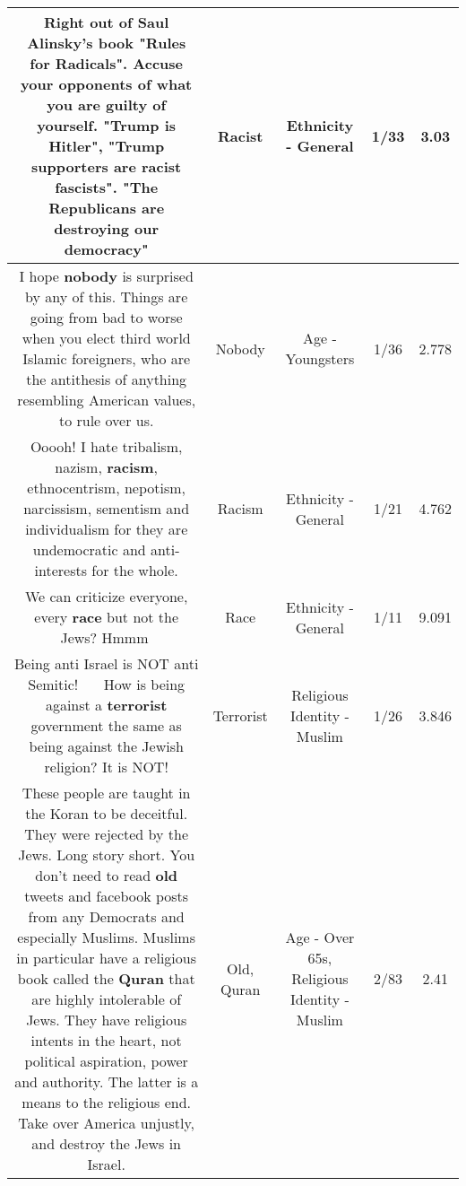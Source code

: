 \documentclass[11pt]{article}
\newlength\mylength
\begin{document}
\begin{center}
\begin{longtable}{|C{.65\mylength}|C{.30\mylength}|C{.12\mylength}|C{.12\mylength}|C{.12\mylength}|}
  \small Right out of Saul Alinsky's book "Rules for Radicals". Accuse your opponents of what you are guilty of yourself. "Trump is Hitler", "Trump supporters are \textbf{racist} fascists". "The Republicans are destroying our democracy"\normalsize   & Racist & Ethnicity - General & 1/33 & 3.03 \\  \hline
  \small I hope \textbf{nobody} is surprised by any of this. Things are going from bad to worse when you elect third world Islamic foreigners, who are the antithesis of anything resembling American values, to rule over us.\normalsize   & Nobody & Age - Youngsters & 1/36 & 2.778 \\  \hline
  \small Ooooh! I hate tribalism,  nazism,  \textbf{racism},  ethnocentrism,  nepotism, narcissism,  sementism and individualism for they are undemocratic and anti-interests for the whole.\normalsize   & Racism & Ethnicity - General & 1/21 & 4.762 \\  \hline
  \small We can criticize everyone, every \textbf{race} but not the Jews? Hmmm🤔\normalsize   & Race & Ethnicity - General & 1/11 & 9.091 \\  \hline
  \small Being anti Israel is NOT anti Semitic! 🤦‍♀️🤦‍♀️ How is being against a \textbf{terrorist} government the same as being against the Jewish religion? It is NOT!\normalsize   & Terrorist & Religious Identity - Muslim & 1/26 & 3.846 \\  \hline
  \small These people are taught in the Koran to be deceitful. They were rejected by the Jews. Long story short. You don't need to read \textbf{old} tweets and facebook posts from any Democrats and especially Muslims. Muslims in particular have a religious book called the \textbf{Quran} that are highly intolerable of Jews. They have religious intents in the heart, not political aspiration, power and authority. The latter is a means to the religious end. Take over America unjustly, and destroy the Jews in Israel.\normalsize   & Old, Quran & Age - Over 65s, Religious Identity - Muslim & 2/83 & 2.41 \\  \hline

\end{longtable}
\end{center}
\end{document}
